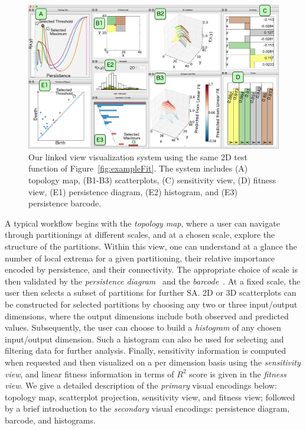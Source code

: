 \begin{figure}[htbp]
  \centering
  \includegraphics[width=\linewidth]{figs/chap6/design-overview}
  \caption{Our linked view visualization system using the same 2D test function of Figure~\ref{fig:exampleFit}. The system includes (A) topology map,
  (B1-B3) scatterplots, (C) sensitivity view, (D) fitness view, (E1) persistence diagram, (E2) histogram, and (E3) persistence barcode.
  }
  \label{fig:design-overview}
\end{figure}

A typical workflow begins with the \emph{topology map}, where a user can navigate through partitionings at different scales, and at a chosen scale, explore the structure of the partitions.
%
Within this view, one can understand at a glance the number of local extrema for a given partitioning, their relative importance encoded by persistence, and their connectivity.
%
The appropriate choice of scale is then validated by the \emph{persistence diagram}~\cite{Cohen-SteinerEdelsbrunnerHarer2007} and the \emph{barcode}~\cite{CarlssonZomorodianCollins2004}.
%
At a fixed scale, the user then selects a subset of partitions for further SA.
%
2D or 3D scatterplots can be constructed for selected partitions by choosing any two or three input/output dimensions, where the output dimensions include both observed and predicted values.
%
Subsequently, the user can choose to build a \emph{histogram} of any chosen input/output dimension.
%
Such a histogram can also be used for selecting and filtering data for further analysis.
%
Finally, sensitivity information is computed when requested and then visualized on a per dimension basis using the \emph{sensitivity view}, and linear fitness information in terms of $R^2$ score is given in the \emph{fitness view}.
%
We give a detailed description of the \emph{primary} visual encodings below: topology map, scatterplot projection, sensitivity view, and fitness view;  followed by a brief introduction to the \emph{secondary} visual encodings: persistence diagram, barcode, and histograms.

